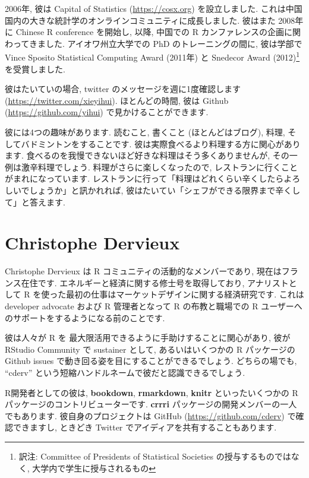 \documentclass[
  11pt,
  lualatex,
  ja=standard]{bxjsreport}
\begin{document}
2006年, 彼は Capital of Statistics (\url{https://cosx.org}) を設立しました. これは中国国内の大きな統計学のオンラインコミュニティに成長しました. 彼はまた 2008年に Chinese R conference を開始し, 以降, 中国での R カンファレンスの企画に関わってきました. アイオワ州立大学での PhD のトレーニングの間に, 彼は学部で Vince Sposito Statistical Computing Award (2011年) と Snedecor Award (2012)\footnote{訳注: Committee of Presidents of Statistical Societies の授与するものではなく, 大学内で学生に授与されるもの}を受賞しました.

彼はたいていの場合, twitter のメッセージを週に1度確認します (\url{https://twitter.com/xieyihui}). ほとんどの時間, 彼は Github (\url{https://github.com/yihui}) で見かけることができます.

彼には4つの趣味があります. 読むこと, 書くこと (ほとんどはブログ), 料理, そしてバドミントンをすることです. 彼は実際食べるより料理する方に関心があります. 食べるのを我慢できないほど好きな料理はそう多くありませんが, その一例は激辛料理でしょう. 料理がさらに楽しくなったので, レストランに行くことがまれになっています. レストランに行って「料理はどれくらい辛くしたらよろしいでしょうか」と訊かれれば, 彼はたいてい「シェフができる限界まで辛くして」と答えます.

\hypertarget{christophe-dervieux}{%
\section*{Christophe Dervieux}\label{christophe-dervieux}}

Christophe Dervieux は R コミュニティの活動的なメンバーであり, 現在はフランス在住です. エネルギーと経済に関する修士号を取得しており, アナリストとして R を使った最初の仕事はマーケットデザインに関する経済研究です. これは developer advocate および R 管理者となって R の布教と職場での R ユーザーへのサポートをするようになる前のことです.

彼は人々が R を 最大限活用できるように手助けすることに関心があり, 彼が RStudio Community で sustainer として, あるいはいくつかの R パッケージの Github issues で動き回る姿を目にすることができるでしょう. どちらの場でも, ``cderv'' という短縮ハンドルネームで彼だと認識できるでしょう.

R開発者としての彼は, \textbf{bookdown}, \textbf{rmarkdown}, \textbf{knitr} といったいくつかの R パッケージのコントリビューターです. \textbf{crrri} パッケージの開発メンバーの一人でもあります. 彼自身のプロジェクトは GitHub (\url{https://github.com/cderv}) で確認できますし, ときどき Twitter でアイディアを共有することもあります.
\end{document}
